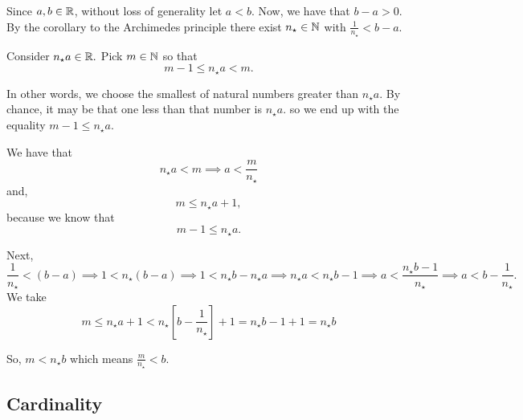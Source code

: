 \documentclass{report}
\begin{document}
\begin{myproof}
  Since $a,b \in \RR$, without loss of generality let $a <b.$ Now, we have that $b-a >0.$ By the corollary to the Archimedes principle there exist $n_\star \in \NN$ with  $\frac{1}{n_\star} < b-a.$ \par
  Consider $n_\star a \in \RR.$ Pick $m \in \NN$ so that $$ m - 1 \leq n_{\star} a < m.$$

In other words, we choose the smallest of natural numbers greater than $n_\star a.$ By chance, it may be that one less than that number is $n_\star a.$ so we end up with the equality $m-1 \leq n_\star a.$ \par

We have that $$ n_\star a < m \implies a < \frac{m}{n_\star}$$ and, $$ m \leq n_\star a + 1,$$ because we know that $$
m - 1 \leq n_{\star} a.$$

Next, $$\frac{1}{n_\star}< (b-a) \implies 1 < n_\star (b -a) \implies 1 < n_\star b - n_\star a \implies n_\star a < n_\star b - 1 \implies a < \frac{n_\star b - 1}{n_\star} \implies a < b - \frac{1}{n_\star}.$$
We take $$ m \leq n_\star a + 1 <  n_\star[b - \frac{1}{n_\star}] + 1 = n_\star b - 1 + 1 = n_\star b$$


So, $m < n_\star b$ which means $ \frac{m}{n_\star} < b.$

\end{myproof}


\subsection{Cardinality}


\end{document}
